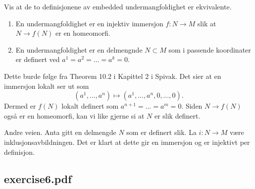 \documentclass[11pt, english]{article}
\begin{document}
\begin{exc}
Vis at de to definisjonene av embedded undermangfoldighet er ekvivalente.

\begin{enumerate}
\item En undermangfoldighet er en injektiv immersjon $f:N \to M$  slik at $N \to f(N)$ er en homeomorfi.
\item En undermangfoldighet er en delmengnde $N \subset M$ som i passende koordinater er definert ved $a^1=a^2=\ldots=a^k=0$.
\end{enumerate}
\end{exc}
\begin{sol}
Dette burde følge fra Theorem 10.2 i Kapittel 2 i Spivak. Det sier at en immersjon lokalt ser ut som
$$
(a^1, \ldots, a^n) \mapsto (a^1,\ldots, a^n,0, \ldots, 0). 
$$
Dermed er $f(N)$ lokalt definert som $a^{n+1}=\ldots = a^m=0$. Siden $N \to f(N)$ også er en homeomorfi, kan vi like gjerne si at $N$ er slik definert.


Andre veien. Anta gitt en delmengde $N$ som er definert slik. La $i: N \to M$ være inklusjonsavbildningen. Det er klart at dette gir en immersjon og er injektivt per definisjon. 
\end{sol}

\subsection{exercise6.pdf}
\end{document}
